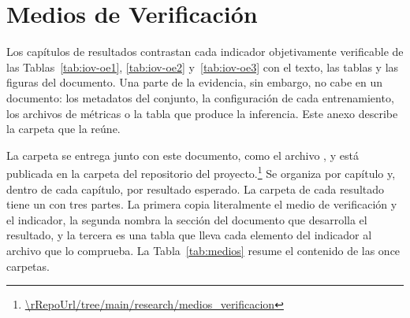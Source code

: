 \chapter{Medios de Verificación}
\label{anx:medios}

Los capítulos de resultados contrastan cada indicador objetivamente verificable de
las Tablas~\ref{tab:iov-oe1}, \ref{tab:iov-oe2} y~\ref{tab:iov-oe3} con el texto,
las tablas y las figuras del documento. Una parte de la evidencia, sin embargo, no
cabe en un documento: los metadatos del conjunto, la configuración de cada
entrenamiento, los archivos de métricas o la tabla que produce la inferencia. Este
anexo describe la carpeta que la reúne.

La carpeta se entrega junto con este documento, como el archivo
, y está publicada en la carpeta
 del repositorio del
proyecto.\footnote{\url{\rRepoUrl/tree/main/research/medios_verificacion}} Se
organiza por capítulo y, dentro de cada capítulo, por resultado esperado. La
carpeta de cada resultado tiene un  con tres partes. La primera
copia literalmente el medio de verificación y el indicador, la segunda nombra la
sección del documento que desarrolla el resultado, y la tercera es una tabla que
lleva cada elemento del indicador al archivo que lo comprueba. La
Tabla~\ref{tab:medios} resume el contenido de las once carpetas.

